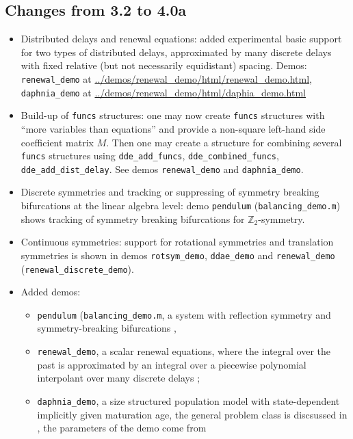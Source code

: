 \documentclass[10pt]{scrartcl}
\newcommand{\blist}[1]{\mbox{\lstinline!#1!}}
\begin{document}
\subsection{Changes from 3.2 to 4.0a}
\label{sec:v32to4a}
\begin{itemize}
\item Distributed delays and renewal equations: added experimental basic support for two types of distributed delays,
  approximated by many discrete delays with fixed relative (but not necessarily
  equidistant) spacing. Demos: \blist{renewal_demo} at \url{../demos/renewal_demo/html/renewal_demo.html}, \blist{daphnia_demo} at \url{../demos/renewal_demo/html/daphia_demo.html}
\item Build-up of \blist{funcs} structures: one may now create \blist{funcs} structures with ``more
  variables than equations'' and provide a non-square left-hand side
  coefficient matrix $M$. Then one may create a structure for
  combining several \blist{funcs} structures using
  \blist{dde_add_funcs}, \blist{dde_combined_funcs},
  \blist{dde_add_dist_delay}. See demos \blist{renewal_demo} and
  \blist{daphnia_demo}.
\item Discrete symmetries and tracking or suppressing of symmetry
  breaking bifurcations at the linear algebra level: demo
  \blist{pendulum} (\blist{balancing_demo.m}) shows tracking of
  symmetry breaking bifurcations for $\mathbb{Z}_2$-symmetry.
\item Continuous symmetries: support for rotational symmetries and
  translation symmetries is shown in demos \blist{rotsym_demo},
  \blist{ddae_demo} and \blist{renewal_demo}
  (\blist{renewal_discrete_demo}).
\item Added demos:
  \begin{itemize}
  \item \blist{pendulum} (\blist{balancing_demo.m}, a
  system with reflection symmetry and symmetry-breaking bifurcations \cite{SK04},
\item \blist{renewal_demo}, a scalar renewal equations, where the
  integral over the past is approximated by an integral over a
  piecewise polynomial interpolant over many discrete delays \cite{breda2016numerical};
\item \blist{daphnia_demo}, a size structured population model with
  state-dependent implicitly given maturation age, the general problem
  class is discsussed in \cite{diekmann2010daphnia}, the parameters of
  the demo come from \cite{ando2020collocation}
\end{itemize}

\end{itemize}
\end{document}
